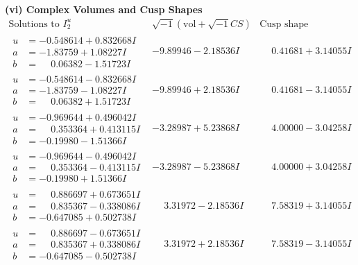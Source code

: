 \documentclass[1p]{elsarticle_modified}
\theoremstyle{definition}
\newcommand{\I}{\sqrt{-1}}
\begin{document}
\newpage\flushleft \textbf{(vi) Complex Volumes and Cusp Shapes}
$$\begin{array}{c|c|c}  
\text{Solutions to }I^u_{2}& \I (\text{vol} + \sqrt{-1}CS) & \text{Cusp shape}\\
 \hline 
\begin{aligned}
u &= -0.548614 + 0.832668 I \\
a &= -1.83759 + 1.08227 I \\
b &= \phantom{-}0.06382 - 1.51723 I\end{aligned}
 & -9.89946 - 2.18536 I & \phantom{-}0.41681 + 3.14055 I \\ \hline\begin{aligned}
u &= -0.548614 - 0.832668 I \\
a &= -1.83759 - 1.08227 I \\
b &= \phantom{-}0.06382 + 1.51723 I\end{aligned}
 & -9.89946 + 2.18536 I & \phantom{-}0.41681 - 3.14055 I \\ \hline\begin{aligned}
u &= -0.969644 + 0.496042 I \\
a &= \phantom{-}0.353364 + 0.413115 I \\
b &= -0.19980 - 1.51366 I\end{aligned}
 & -3.28987 + 5.23868 I & \phantom{-}4.00000 - 3.04258 I \\ \hline\begin{aligned}
u &= -0.969644 - 0.496042 I \\
a &= \phantom{-}0.353364 - 0.413115 I \\
b &= -0.19980 + 1.51366 I\end{aligned}
 & -3.28987 - 5.23868 I & \phantom{-}4.00000 + 3.04258 I \\ \hline\begin{aligned}
u &= \phantom{-}0.886697 + 0.673651 I \\
a &= \phantom{-}0.835367 - 0.338086 I \\
b &= -0.647085 + 0.502738 I\end{aligned}
 & \phantom{-}3.31972 - 2.18536 I & \phantom{-}7.58319 + 3.14055 I \\ \hline\begin{aligned}
u &= \phantom{-}0.886697 - 0.673651 I \\
a &= \phantom{-}0.835367 + 0.338086 I \\
b &= -0.647085 - 0.502738 I\end{aligned}
 & \phantom{-}3.31972 + 2.18536 I & \phantom{-}7.58319 - 3.14055 I \\ \hline\begin{aligned}

\end{aligned}
\end{array}$$
\end{document}
